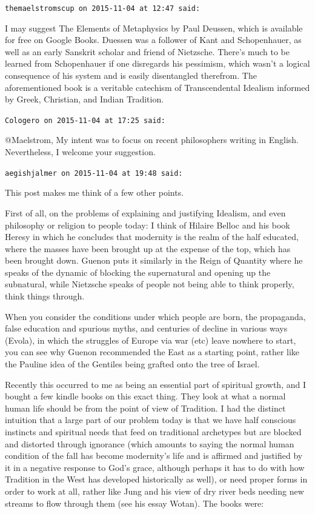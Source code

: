 \begin{footnotesize}\begin{sffamily}

\texttt{themaelstromscup on 2015-11-04 at 12:47 said: }

I may suggest The Elements of Metaphysics by Paul Deussen, which is available for free on Google Books. Duessen was a
follower of Kant and Schopenhauer, as well as an early Sanskrit scholar and friend of Nietzsche. There's
much to be learned from Schopenhauer if one disregards his pessimism, which wasn't a logical consequence of
his system and is easily disentangled therefrom. The aforementioned book is a veritable catechism of Transcendental
Idealism informed by Greek, Christian, and Indian Tradition.


\hfill

\texttt{Cologero on 2015-11-04 at 17:25 said: }

@Maelstrom,\newline
My intent was to focus on recent philosophers writing in English. Nevertheless, I welcome your suggestion.


\hfill

\texttt{aegishjalmer on 2015-11-04 at 19:48 said: }

This post makes me think of a few other points. 

First of all, on the problems of explaining and justifying Idealism, and even philosophy or religion to people today: I
think of Hilaire Belloc and his book Heresy in which he concludes that modernity is the realm of the half educated,
where the masses have been brought up at the expense of the top, which has been brought down. Guenon puts it similarly
in the Reign of Quantity where he speaks of the dynamic of blocking the supernatural and opening up the subnatural,
while Nietzsche speaks of people not being able to think properly, think things through. 

When you consider the conditions under which people are born, the propaganda, false education and spurious myths, and
centuries of decline in various ways (Evola), in which the struggles of Europe via war (etc) leave nowhere to start,
you can see why Guenon recommended the East as a starting point, rather like the Pauline idea of the Gentiles being
grafted onto the tree of Israel. 

Recently this occurred to me as being an essential part of spiritual growth, and I bought a few kindle books on this
exact thing. They look at what a normal human life should be from the point of view of Tradition. I had the distinct
intuition that a large part of our problem today is that we have half conscious instincts and spiritual needs that feed
on traditional archetypes but are blocked and distorted through ignorance (which amounts to saying the normal human
condition of the fall has become modernity's life and is affirmed and justified by it in a negative
response to God's grace, although perhaps it has to do with how Tradition in the West has developed
historically as well), or need proper forms in order to work at all, rather like Jung and his view of dry river beds
needing new streams to flow through them (see his essay Wotan). The books were:


\end{sffamily}
\end{footnotesize}
